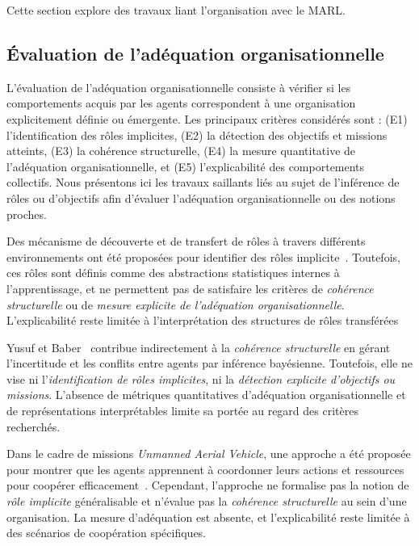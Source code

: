 \documentclass[francais,ROIA,Unicode,manuscript]{cedram}
\begin{document}
Cette section explore des travaux liant l'organisation avec le MARL.

\subsection{Évaluation de l'adéquation organisationnelle}

L'évaluation de l'adéquation organisationnelle consiste à vérifier si les comportements acquis par les agents correspondent à une organisation explicitement définie ou émergente. Les principaux critères considérés sont :
(E1) l’identification des rôles implicites,
(E2) la détection des objectifs et missions atteints,
(E3) la cohérence structurelle,
(E4) la mesure quantitative de l’adéquation organisationnelle,
et (E5) l’explicabilité des comportements collectifs.
%
Nous présentons ici les travaux saillants liés au sujet de l'inférence de rôles ou d'objectifs afin d'évaluer l'adéquation organisationnelle ou des notions proches.

Des mécanisme de découverte et de transfert de rôles à travers différents environnements ont été proposées pour identifier des rôles implicite~\cite{wilson2008learning}. Toutefois, ces rôles sont définis comme des abstractions statistiques internes à l’apprentissage, et ne permettent pas de satisfaire les critères de \emph{cohérence structurelle} ou de \emph{mesure explicite de l’adéquation organisationnelle}. L’explicabilité reste limitée à l’interprétation des structures de rôles transférées

Yusuf et Baber~\cite{yusuf2020inferential} contribue indirectement à la \emph{cohérence structurelle} en gérant l’incertitude et les conflits entre agents par inférence bayésienne. Toutefois, elle ne vise ni l’\emph{identification de rôles implicites}, ni la \emph{détection explicite d’objectifs ou missions}. L’absence de métriques quantitatives d’adéquation organisationnelle et de représentations interprétables limite sa portée au regard des critères recherchés.

Dans le cadre de missions \textit{Unmanned Aerial Vehicle}, une approche a été proposée pour montrer que les agents apprennent à coordonner leurs actions et ressources pour coopérer efficacement~\cite{berenji2000learning}. Cependant, l’approche ne formalise pas la notion de \emph{rôle implicite} généralisable et n’évalue pas la \emph{cohérence structurelle} au sein d’une organisation. La mesure d’adéquation est absente, et l’explicabilité reste limitée à des scénarios de coopération spécifiques.
\end{document}
